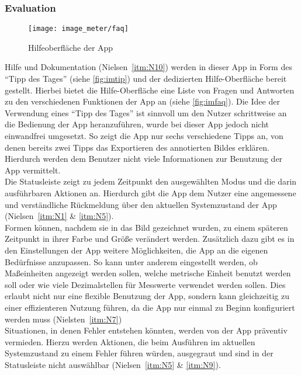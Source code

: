 \subsubsection{Evaluation}\label{subsec:imeva}
\begin{wrapfigure}{R}{0.4\textwidth}
  \centering
  \texttt{[image: image\_meter/faq]}
  \caption{Hilfeoberfläche der App}
  \label{fig:imfaq}
\end{wrapfigure}

Hilfe und Dokumentation (Nielsen~\autoref{itm:N10}) werden in dieser App in Form des ``Tipp des Tages'' (siehe \autoref{fig:imtip}) und der dedizierten Hilfe-Oberfläche bereit gestellt.
Hierbei bietet die Hilfe-Oberfläche eine Liste von Fragen und Antworten zu den verschiedenen Funktionen der App an (siehe \autoref{fig:imfaq}). 
Die Idee der Verwendung eines ``Tipp des Tages'' ist sinnvoll um den Nutzer schrittweise an die Bedienung der App heranzuführen, wurde bei dieser App jedoch nicht einwandfrei umgesetzt.
So zeigt die App nur sechs verschiedene Tipps an, von denen bereits zwei Tipps das Exportieren des annotierten Bildes erklären.
Hierdurch werden dem Benutzer nicht viele Informationen zur Benutzung der App vermittelt. \\

Die Statusleiste zeigt zu jedem Zeitpunkt den ausgewählten Modus und die darin ausführbaren Aktionen an.
Hierdurch gibt die App dem Nutzer eine angemessene und verständliche Rückmeldung über den aktuellen Systemzustand der App (Nielsen~\autoref{itm:N1} \& \autoref{itm:N5}). \\

Formen können, nachdem sie in das Bild gezeichnet wurden, zu einem späteren Zeitpunkt in ihrer Farbe und Größe verändert werden.
Zusätzlich dazu gibt es in den Einstellungen der App weitere Möglichkeiten, die App an die eigenen Bedürfnisse anzupassen.
So kann unter anderem eingestellt werden, ob Maßeinheiten angezeigt werden sollen, welche metrische Einheit benutzt werden soll oder wie viele Dezimalstellen für Messwerte verwendet werden sollen.
Dies erlaubt nicht nur eine flexible Benutzung der App, sondern kann gleichzeitig zu einer effizienteren Nutzung führen, da die App nur einmal zu Beginn konfiguriert werden muss (Nielsten~\autoref{itm:N7}) \\

Situationen, in denen Fehler entstehen könnten, werden von der App präventiv vermieden.
Hierzu werden Aktionen, die beim Ausführen im aktuellen Systemzustand zu einem Fehler führen würden, ausgegraut und sind in der Statusleiste nicht auswählbar (Nielsen~\autoref{itm:N5} \& \autoref{itm:N9}). \\

